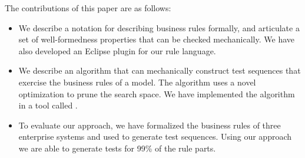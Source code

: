 The contributions of this paper are as follows:
\begin{itemize}[noitemsep]
\item We describe a notation for describing business rules formally, and articulate
  a set of well-formedness properties that can be checked mechanically. We have 
  also developed an Eclipse plugin for our rule language.
\item We describe an algorithm that can mechanically construct test sequences
  that exercise the business rules of a model. The algorithm uses a
  novel optimization to prune the search space. We have implemented
  the algorithm in a tool called \tool{}.
\item To evaluate our approach, we have formalized the business rules
  of three enterprise systems and used \tool{} to generate test
  sequences. Using our approach we are able to generate tests for 99\%
  of the rule parts.
\end{itemize}

